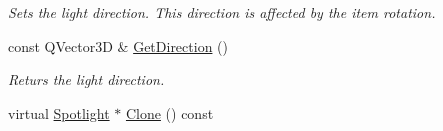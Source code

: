 \begin{DoxyCompactItemize}
\begin{DoxyCompactList}\small\item\em Sets the light direction. This direction is affected by the item rotation. \end{DoxyCompactList}\item 
\mbox{\label{class_geometry_engine_1_1_geometry_world_item_1_1_geometry_light_1_1_spotlight_a6ee82eb72526116bf4ad3eec48367ade}} 
const Q\+Vector3D \& \mbox{\hyperlink{class_geometry_engine_1_1_geometry_world_item_1_1_geometry_light_1_1_spotlight_a6ee82eb72526116bf4ad3eec48367ade}{Get\+Direction}} ()
\begin{DoxyCompactList}\small\item\em Returs the light direction. \end{DoxyCompactList}\item 
virtual \mbox{\hyperlink{class_geometry_engine_1_1_geometry_world_item_1_1_geometry_light_1_1_spotlight}{Spotlight}} $\ast$ \mbox{\hyperlink{class_geometry_engine_1_1_geometry_world_item_1_1_geometry_light_1_1_spotlight_a7feb062f72b8110cf7d8d614d2daad92}{Clone}} () const
\end{DoxyCompactItemize}
